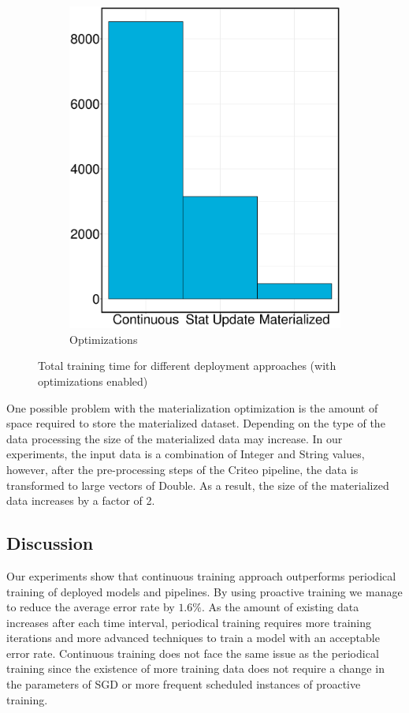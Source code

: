 \begin{figure}[h]
\begin{subfigure}{\columnwidth/2}
\includegraphics[width=\columnwidth]{../images/experiment-results/criteo-training-time-optimizations-experiment.eps}
\caption{Optimizations}
\label{fig:training-time-optimization}
\end{subfigure}
\vspace{2mm}
\caption{Total training time for different deployment approaches (with optimizations enabled)}
\end{figure}

One possible problem with the materialization optimization is the amount of space required to store the materialized dataset.
Depending on the type of the data processing the size of the materialized data may increase.
In our experiments, the input data is a combination of Integer and String values, however, after the pre-processing steps of the Criteo pipeline, the data is transformed to large vectors of Double.
As a result, the size of the materialized data increases by a factor of 2.

\subsection{Discussion} \label{subsec:discussion}
Our experiments show that continuous training approach outperforms periodical training of deployed models and pipelines.
By using proactive training we manage to reduce the average error rate by $1.6\%$.
As the amount of existing data increases after each time interval, periodical training requires more training iterations and more advanced techniques to train a model with an acceptable error rate.
Continuous training does not face the same issue as the periodical training since the existence of more training data does not require a change in the parameters of SGD or more frequent scheduled instances of proactive training. 

